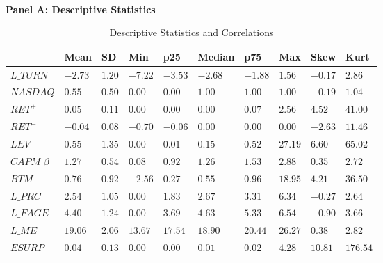 
\begin{table}



\caption[Correlations and Descriptive Statistics]{\label{tab:correlations_and_summary_stat_POOLED_old}Descriptive Statistics and Correlations}
\centering
\fontsize{8}{10}\selectfont
\begin{threeparttable}
\phantom{ }\\
\textbf{Panel A: Descriptive Statistics}
\begin{tabular}[t]{>{\raggedright\arraybackslash}p{2.5cm}>{\raggedleft\arraybackslash}p{1cm}>{\raggedleft\arraybackslash}p{1cm}>{\raggedleft\arraybackslash}p{1cm}>{\raggedleft\arraybackslash}p{1cm}>{\raggedleft\arraybackslash}p{1cm}>{\raggedleft\arraybackslash}p{1cm}>{\raggedleft\arraybackslash}p{1cm}>{\raggedleft\arraybackslash}p{1cm}>{\raggedleft\arraybackslash}p{1cm}}
\toprule
  & \textbf{Mean} & \textbf{SD} & \textbf{Min} & \textbf{p25} & \textbf{Median} & \textbf{p75} & \textbf{Max} & \textbf{Skew} & \textbf{Kurt}\\
\midrule
$L\_TURN$ & $-2.73$ & $1.20$ & $-7.22$ & $-3.53$ & $-2.68$ & $-1.88$ & $1.56$ & $-0.17$ & $2.86$\\
\addlinespace
$NASDAQ$ & $0.55$ & $0.50$ & $0.00$ & $0.00$ & $1.00$ & $1.00$ & $1.00$ & $-0.19$ & $1.04$\\
\addlinespace
$RET^+$ & $0.05$ & $0.11$ & $0.00$ & $0.00$ & $0.00$ & $0.07$ & $2.56$ & $4.52$ & $41.00$\\
\addlinespace
$RET^-$ & $-0.04$ & $0.08$ & $-0.70$ & $-0.06$ & $0.00$ & $0.00$ & $0.00$ & $-2.63$ & $11.46$\\
\addlinespace
$LEV$ & $0.55$ & $1.35$ & $0.00$ & $0.01$ & $0.15$ & $0.52$ & $27.19$ & $6.60$ & $65.02$\\
\addlinespace
$CAPM\_\beta$ & $1.27$ & $0.54$ & $0.08$ & $0.92$ & $1.26$ & $1.53$ & $2.88$ & $0.35$ & $2.72$\\
\addlinespace
$BTM$ & $0.76$ & $0.92$ & $-2.56$ & $0.27$ & $0.55$ & $0.96$ & $18.95$ & $4.21$ & $36.50$\\
\addlinespace
$L\_PRC$ & $2.54$ & $1.05$ & $0.00$ & $1.83$ & $2.67$ & $3.31$ & $6.34$ & $-0.27$ & $2.64$\\
\addlinespace
$L\_FAGE$ & $4.40$ & $1.24$ & $0.00$ & $3.69$ & $4.63$ & $5.33$ & $6.54$ & $-0.90$ & $3.66$\\
\addlinespace
$L\_ME$ & $19.06$ & $2.06$ & $13.67$ & $17.54$ & $18.90$ & $20.44$ & $26.27$ & $0.38$ & $2.82$\\
\addlinespace
$ESURP$ & $0.04$ & $0.13$ & $0.00$ & $0.00$ & $0.01$ & $0.02$ & $4.28$ & $10.81$ & $176.54$\\

\end{tabular}
\end{threeparttable}
\end{table}

